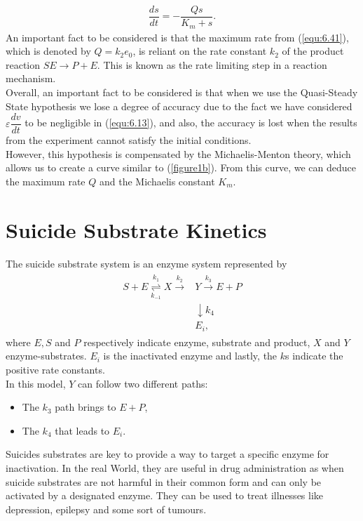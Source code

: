 \documentclass[a4paper]{report}
\theoremstyle{definition}
\begin{document}
\begin{align}\label{equ:6.42}
\dfrac{ds}{dt}=-\dfrac{Qs}{K_m+s}.
\end{align} 
An important fact to be considered is that the maximum rate from (\ref{equ:6.41}), which is denoted by $Q=k_2e_0$, is reliant on the rate constant $k_2$ of the product reaction $SE\rightarrow P+E$. This is known as the rate limiting step in a reaction mechanism.\\
Overall, an important fact to be considered is that when we use the Quasi-Steady State hypothesis we lose a degree of accuracy due to the fact we have considered $\varepsilon\dfrac{dv}{dt}$ to be negligible in (\ref{equ:6.13}), and also, the accuracy is lost when the results from the experiment cannot satisfy the initial conditions.\\
However, this hypothesis is compensated by the Michaelis-Menton theory, which allows us to create a curve similar to (\ref{figure1b}). From this curve, we can deduce the maximum rate $Q$ and the Michaelis constant $K_m$. 
\section{Suicide Substrate Kinetics}
The suicide substrate system is an enzyme system represented by
\begin{align}
\begin{split}
S+E \overset{k_1} {\underset{k_{-1}}{\rightleftharpoons}}X \overset{k_2}{\rightarrow}&Y \overset{k_3}{\rightarrow}E+P \\
&\downarrow k_4 \\
&E_i,
\label{eq:lg26}
\end{split}
\end{align}
where $E, S$ and $P$ respectively indicate enzyme, substrate and product, $X$ and $Y$ enzyme-substrates. $E_i$ is the inactivated enzyme and lastly, the $k$s indicate the positive rate constants. 
\\
In this model, $Y$ can follow two different paths: 
\begin{itemize}
\item The $k_3$ path brings to $E+P$,
\item The $k_4$ that leads to $E_i$.
\end{itemize}
Suicides substrates are key to provide a way to target a specific enzyme for inactivation. In the real World, they are useful in drug administration as when suicide substrates are not harmful in their common form and can only be activated by a designated enzyme. They can be used to treat illnesses like depression, epilepsy and some sort of tumours. 
\end{document}
